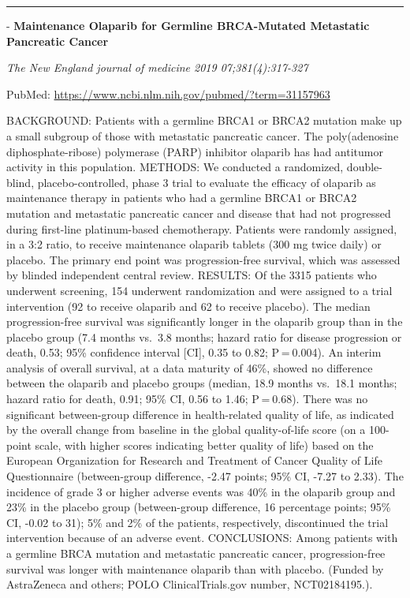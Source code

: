 \documentclass[]{article}
\begin{document}
{}

\begin{center}\rule{0.5\linewidth}{\linethickness}\end{center}

 - \textbf{Maintenance Olaparib for Germline BRCA-Mutated Metastatic
Pancreatic Cancer}

\emph{The New England journal of medicine 2019 07;381(4):317-327}

PubMed: \url{https://www.ncbi.nlm.nih.gov/pubmed/?term=31157963}

BACKGROUND: Patients with a germline BRCA1 or BRCA2 mutation make up a
small subgroup of those with metastatic pancreatic cancer. The
poly(adenosine diphosphate-ribose) polymerase (PARP) inhibitor olaparib
has had antitumor activity in this population. METHODS: We conducted a
randomized, double-blind, placebo-controlled, phase 3 trial to evaluate
the efficacy of olaparib as maintenance therapy in patients who had a
germline BRCA1 or BRCA2 mutation and metastatic pancreatic cancer and
disease that had not progressed during first-line platinum-based
chemotherapy. Patients were randomly assigned, in a 3:2 ratio, to
receive maintenance olaparib tablets (300 mg twice daily) or placebo.
The primary end point was progression-free survival, which was assessed
by blinded independent central review. RESULTS: Of the 3315 patients who
underwent screening, 154 underwent randomization and were assigned to a
trial intervention (92 to receive olaparib and 62 to receive placebo).
The median progression-free survival was significantly longer in the
olaparib group than in the placebo group (7.4 months vs.~3.8 months;
hazard ratio for disease progression or death, 0.53; 95\% confidence
interval {[}CI{]}, 0.35 to 0.82; P = 0.004). An interim analysis of
overall survival, at a data maturity of 46\%, showed no difference
between the olaparib and placebo groups (median, 18.9 months vs.~18.1
months; hazard ratio for death, 0.91; 95\% CI, 0.56 to 1.46; P = 0.68).
There was no significant between-group difference in health-related
quality of life, as indicated by the overall change from baseline in the
global quality-of-life score (on a 100-point scale, with higher scores
indicating better quality of life) based on the European Organization
for Research and Treatment of Cancer Quality of Life Questionnaire
(between-group difference, -2.47 points; 95\% CI, -7.27 to 2.33). The
incidence of grade 3 or higher adverse events was 40\% in the olaparib
group and 23\% in the placebo group (between-group difference, 16
percentage points; 95\% CI, -0.02 to 31); 5\% and 2\% of the patients,
respectively, discontinued the trial intervention because of an adverse
event. CONCLUSIONS: Among patients with a germline BRCA mutation and
metastatic pancreatic cancer, progression-free survival was longer with
maintenance olaparib than with placebo. (Funded by AstraZeneca and
others; POLO ClinicalTrials.gov number, NCT02184195.).
\end{document}
